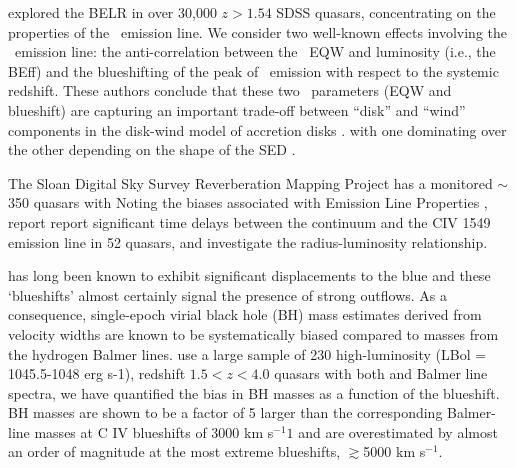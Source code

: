 \documentclass[a4paper,fleqn,usenatbib]{mnras}
\begin{document}
\citet{Richards2011} explored the BELR in over 30,000 $z > 1.54$ SDSS
quasars, concentrating on the properties of the \civ\ emission
line. We consider two well-known effects involving the \civ\ emission
line: the anti-correlation between the \civ\ EQW and luminosity (i.e.,
the BEff) and the blueshifting of the peak of \civ\ emission with
respect to the systemic redshift. These authors conclude that these
two \civ\ parameters (EQW and blueshift) are capturing an important
trade-off between ``disk'' and ``wind'' components in the disk-wind
model of accretion disks \citep[e.g.,][]{Murray1995, Elvis2000,
Proga2000}.  with one dominating over the other depending on the shape
of the SED \citep[][strong \civ EQW indicates a more ionizing SED and
large \civ blueshift indicating a less ionizing SED]{Leighly2004b}.

The Sloan Digital Sky Survey Reverberation Mapping Project
\cite[(SDSS-RM)][]{Shen2015} has a monitored $\sim$350 quasars with
\civ Noting the biases associated with \civ Emission Line Properties
\citep[e.g. increasing systematic offsets with decreasing
signal-to-noise][]{Denney2016}, \citet{Grier2019} report report
significant time delays between the continuum and the CIV 1549
emission line in 52 quasars, and investigate the \civ
radius-luminosity relationship.

\civ has long been known to exhibit significant displacements to the
blue and these `blueshifts' almost certainly signal the presence of
strong outflows. As a consequence, single-epoch virial black hole (BH)
mass estimates derived from \civ velocity widths are known to be
systematically biased compared to masses from the hydrogen Balmer
lines. \citet{Coatman2017} use a large sample of 230 high-luminosity
(LBol = 1045.5-1048 erg s-1), redshift $1.5 < z < 4.0$ quasars with
both \civ and Balmer line spectra, we have quantified the bias in \civ
BH masses as a function of the \civ blueshift. \civ BH masses are
shown to be a factor of 5 larger than the corresponding Balmer-line
masses at C IV blueshifts of 3000 km s$^{-1}1$ and are overestimated
by almost an order of magnitude at the most extreme blueshifts,
$\gtrsim$5000 km s$^{-1}$.
\end{document}
